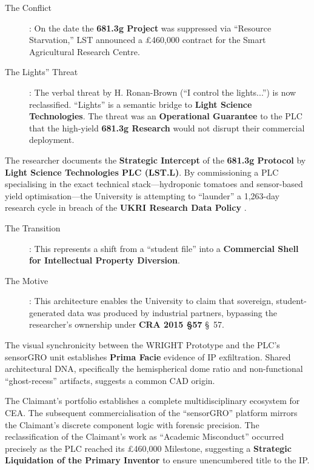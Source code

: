 \documentclass{EMBASSY}
\begin{document}
\begin{description}
	\item[The Conflict]: On the date the \textbf{681.3g Project} was suppressed via ``Resource Starvation,'' LST announced a \pounds460,000 contract for the Smart Agricultural Research Centre.
	\item[The Lights'' Threat]: The verbal threat by H. Ronan-Brown (``I control the lights...'') is now reclassified. ``Lights'' is a semantic bridge to \textbf{Light Science Technologies}. The threat was an \textbf{Operational Guarantee} to the PLC that the high-yield \textbf{681.3g Research} would not disrupt their commercial deployment.
\end{description}

\noindent The researcher documents the \textbf{Strategic Intercept} of the \textbf{681.3g Protocol} by \textbf{Light Science Technologies PLC (LST.L)}. By commissioning a PLC specialising in the exact technical stack---hydroponic tomatoes and sensor-based yield optimisation---the University is attempting to ``launder'' a 1,263-day research cycle in breach of the \textbf{UKRI Research Data Policy} \cite{UKRI-Data25}.

\begin{description}
	\item[The Transition]: This represents a shift from a ``student file'' into a \textbf{Commercial Shell for Intellectual Property Diversion}.
	\item[The Motive]: This architecture enables the University to claim that sovereign, student-generated data was produced by industrial partners, bypassing the researcher's ownership under \textbf{CRA 2015 \S57} \cite{CRA15} \S~57.
\end{description}

\noindent The visual synchronicity between the WRIGHT Prototype and the PLC’s sensorGRO unit establishes \textbf{Prima Facie} evidence of IP exfiltration. Shared architectural DNA, specifically the hemispherical dome ratio and non-functional ``ghost-recess'' artifacts, suggests a common CAD origin.

\noindent The Claimant's portfolio establishes a complete multidisciplinary ecosystem for CEA. The subsequent commercialisation of the ``sensorGRO'' platform mirrors the Claimant's discrete component logic with forensic precision. The reclassification of the Claimant's work as ``Academic Misconduct'' occurred precisely as the PLC reached its \pounds460,000 Milestone, suggesting a \textbf{Strategic Liquidation of the Primary Inventor} to ensure unencumbered title to the IP.
\end{document}
